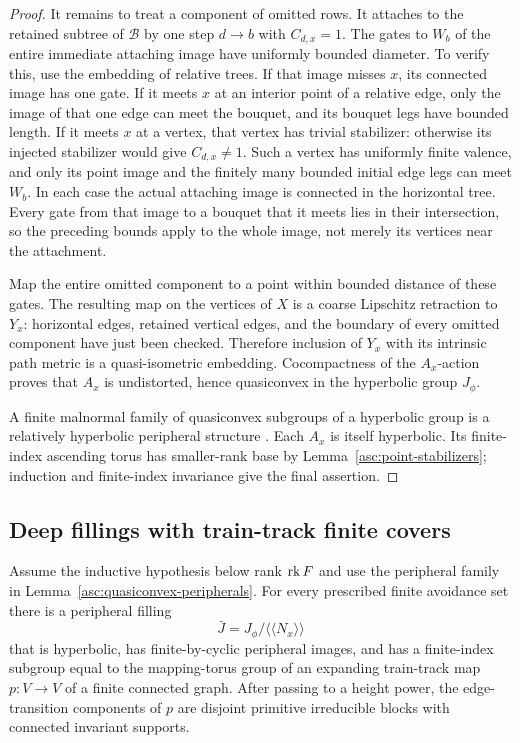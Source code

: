 \begin{proof}
It remains to treat a component of omitted rows. It attaches to the
retained subtree of $\mathcal B$ by one step $d\to b$ with $C_{d,x}=1$.
The gates to $W_b$ of the entire immediate attaching image have uniformly
bounded diameter. To verify this, use the embedding of relative trees.
If that image misses $x$, its connected image has one gate. If it meets
$x$ at an interior point of a relative edge, only the image of that one
edge can meet the bouquet, and its bouquet legs have bounded length.
If it meets $x$ at a vertex, that vertex has trivial stabilizer: otherwise
its injected stabilizer would give $C_{d,x}\ne1$. Such a vertex has
uniformly finite valence, and only its point image and the finitely many
bounded initial edge legs can meet $W_b$. In each case the actual
attaching image is connected in the horizontal tree. Every gate from
that image to a bouquet that it meets lies in their intersection, so
the preceding bounds apply to the whole image, not merely its vertices
near the attachment.

Map the entire omitted component to a point within bounded distance of
these gates. The resulting map on the vertices of $X$ is a coarse
Lipschitz retraction to $Y_x$: horizontal edges, retained vertical edges,
and the boundary of every omitted component have just been checked.
Therefore inclusion of $Y_x$ with its intrinsic path metric is a
quasi-isometric embedding. Cocompactness of the $A_x$-action proves that
$A_x$ is undistorted, hence quasiconvex in the hyperbolic group $J_\phi$.

A finite malnormal family of quasiconvex subgroups of a hyperbolic group
is a relatively hyperbolic peripheral structure \cite{Bowditch2012}.
Each $A_x$ is itself hyperbolic. Its finite-index ascending torus has
smaller-rank base by Lemma~\ref{asc:point-stabilizers}; induction and
finite-index invariance give the final assertion.
\end{proof}

\subsection{Deep fillings with train-track finite covers}

\begin{lemma}\label{asc:good-train-track-filling}
Assume the inductive hypothesis below rank $\operatorname{rk} F$ and use the peripheral
family in Lemma~\ref{asc:quasiconvex-peripherals}. For every prescribed
finite avoidance set there is a peripheral filling
\[
 \bar J=J_\phi/\langle\!\langle N_x\rangle\!\rangle
\]
that is hyperbolic, has finite-by-cyclic peripheral images, and has a
finite-index subgroup equal to the mapping-torus group of an expanding
train-track map $p:V\to V$ of a finite connected graph. After passing to
a height power, the edge-transition components of $p$ are disjoint
primitive irreducible blocks with connected invariant supports.
\end{lemma}

